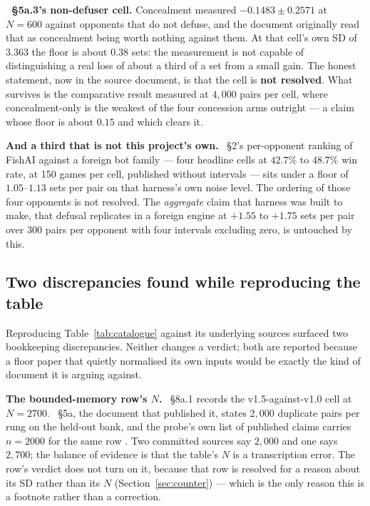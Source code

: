 \documentclass[11pt]{article}
\begin{document}
\textbf{\cite{concession}~\S5a.3's non-defuser cell.} Concealment measured $-0.1483 \pm 0.2571$ at
$N=600$ against opponents that do not defuse, and the document originally read that as concealment
being worth nothing against them. At that cell's own SD of $3.363$ the floor is about $0.38$ sets:
the measurement is not capable of distinguishing a real loss of about a third of a set from a small
gain. The honest statement, now in the source document, is that the cell is \textbf{not resolved}.
What survives is the comparative result measured at $4{,}000$ pairs per cell, where concealment-only
is the weakest of the four concession arms outright --- a claim whose floor is about $0.15$ and which
clears it.

\textbf{And a third that is not this project's own.} \cite{crossplay}~\S2's per-opponent ranking of
FishAI against a foreign bot family --- four headline cells at $42.7\%$ to $48.7\%$ win rate, at 150
games per cell, published without intervals --- sits under a floor of $1.05$--$1.13$ sets per pair on
that harness's own noise level. The ordering of those four opponents is not resolved. The
\emph{aggregate} claim that harness was built to make, that defusal replicates in a foreign engine at
$+1.55$ to $+1.75$ sets per pair over 300 pairs per opponent with four intervals excluding zero, is
untouched by this.

\subsection{Two discrepancies found while reproducing the table}
\label{sec:discrep}

Reproducing Table~\ref{tab:catalogue} against its underlying sources surfaced two bookkeeping
discrepancies. Neither changes a verdict; both are reported because a floor paper that quietly
normalised its own inputs would be exactly the kind of document it is arguing against.

\textbf{The bounded-memory row's $N$.} \cite{concession}~\S8a.1 records the v1.5-against-v1.0 cell at
$N=2700$. \cite{bounded}~\S5a, the document that published it, states $2{,}000$ duplicate pairs per
rung on the held-out bank, and the probe's own list of published claims carries $n = 2000$ for the
same row \cite{probefloor}. Two committed sources say $2{,}000$ and one says $2{,}700$; the balance
of evidence is that the table's $N$ is a transcription error. The row's verdict does not turn on it,
because that row is resolved for a reason about its SD rather than its $N$
(Section~\ref{sec:counter}) --- which is the only reason this is a footnote rather than a
correction.
\end{document}
